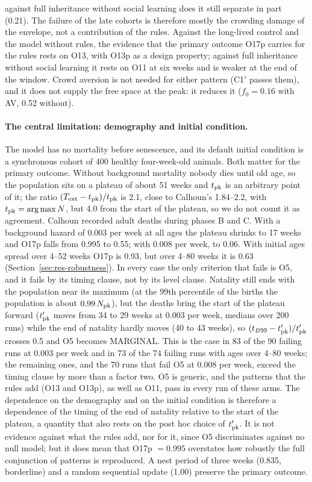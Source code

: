 against full inheritance without social learning does it still separate in part (0.21). The failure of the late
cohorts is therefore mostly the crowding damage of the envelope, not a contribution of the rules. Against the
long-lived control and the model without rules, the evidence that the primary outcome O17p carries for the rules
rests on O13, with O13p as a design property; against full inheritance without social learning it rests on O11 at
six weeks and is weaker at the end of the window. Crowd aversion is not needed for either pattern (\textsf{C1}$'$
passes them), and it does not supply the free space at the peak: it reduces it ($f_0=0.16$ with AV, 0.52 without).

\paragraph{The central limitation: demography and initial condition.}
The model has no mortality before senescence, and its default initial condition is a synchronous cohort of 400
healthy four-week-old animals. Both matter for the primary outcome. Without background mortality nobody dies until
old age, so the population sits on a plateau of about 51 weeks and $t_{\rm pk}$ is an arbitrary point of it; the ratio
$(T_{\rm ext}-t_{\rm pk})/t_{\rm pk}$ is 2.1, close to Calhoun's 1.84--2.2, with $t_{\rm pk}=\arg\max N$, but 4.0
from the start of the plateau, so we do not count it as agreement. Calhoun recorded adult deaths during phases B and
C. With a background hazard of 0.003 per week at all ages the plateau shrinks to 17 weeks and O17p falls from 0.995
to 0.55; with 0.008 per week, to 0.06. With initial ages spread over 4--52 weeks O17p is 0.93, but over 4--80 weeks it
is 0.63 (Section~\ref{sec:res-robustness}). In every case the only criterion that fails is O5, and it fails by its
timing clause, not by its level clause. Natality still ends with the population near its maximum (at the 99th
percentile of the births the population is about $0.99\,N_{\rm pk}$), but the deaths bring the start of the plateau
forward ($t'_{\rm pk}$ moves from 34 to 29 weeks at 0.003 per week, medians over 200 runs) while the end of natality
hardly moves (40 to 43 weeks), so $(t_{B99}-t'_{\rm pk})/t'_{\rm pk}$ crosses 0.5 and O5 becomes MARGINAL. This is
the case in 83 of the 90 failing runs at 0.003 per week and in 73 of the 74 failing runs with ages over 4--80 weeks;
the remaining ones, and the 70 runs that fail O5 at 0.008 per week, exceed the timing clause by more than a factor
two. O5 is generic, and the patterns that the rules add (O13 and O13p), as well as O11, pass in every run of these
arms. The
dependence on the demography and on the initial condition is therefore a dependence of the timing of the end of
natality relative to the start of the plateau, a quantity that also rests on the post hoc choice of $t'_{\rm pk}$.
It is not evidence against what the rules add, nor for it, since O5 discriminates against no null model; but it
does mean that O17p $=0.995$ overstates how robustly the full conjunction of patterns is reproduced. A nest period
of three weeks (0.835, borderline) and a random sequential update (1.00) preserve the primary outcome.

